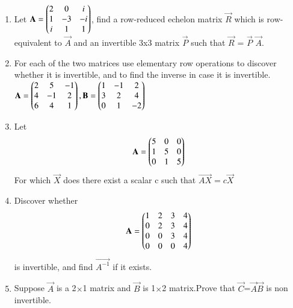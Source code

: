 \renewcommand{\theequation}{\theenumi}
\renewcommand{\thefigure}{\theenumi}
\begin{enumerate}[label=\thesubsection.\arabic*.,ref=\thesubsection.\theenumi]
%
\item Let $\mathbf{A}= \begin{pmatrix}2 & 0 & i \\ 1 & -3 & -i \\ i & 1 &  1\end{pmatrix}$, find a row-reduced echelon matrix $\vec{R}$ which is row-equivalent to $\vec{A}$ and an invertible 3x3 matrix $\vec{P}$ such that $\vec{R}$ = $\vec{P}$ $\vec{A}$.
%
\solution

%
\item For each of the two matrices use elementary row operations to discover whether it is invertible, and to find the inverse in case it is invertible.\\

$\mathbf{A}=\begin{pmatrix}2&5&-1\\4&-1&2\\6&4&1\end{pmatrix},
\mathbf{B}=\begin{pmatrix}1&-1&2\\3&2&4\\0&1&-2\end{pmatrix}$
%
\\
%
\solution

\item Let 
\begin{align}
	\mathbf{A} = \begin{pmatrix}5 & 0 & 0\\1 & 5 & 0\\0 & 1 & 5\end{pmatrix}
\end{align}
For which $\vec{X}$ does there exist a scalar c such that $\vec{AX} = c \vec{X}$
%
\\
%
\solution

\item Discover whether
\begin{align}
	\mathbf{A}=\begin{pmatrix} 1 & 2 & 3 & 4 \\
			0 & 2 & 3 & 4 \\
			0 & 0 & 3 & 4 \\
			0 & 0 & 0 & 4\end{pmatrix}
\end{align}
is invertible, and find $\vec{A^{-1}}$ if it exists.
\\
%
\solution

%
\item Suppose $\vec{A}$ is a 2$\times$1  matrix and $\vec{B}$ is 1$\times$2 matrix.Prove that $\vec{C}$=$\vec{A}$$\vec{B}$ is non invertible.


\end{enumerate}
